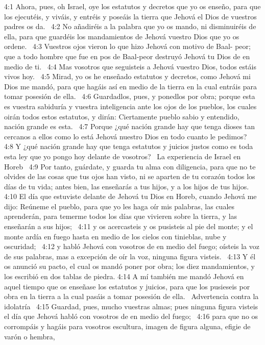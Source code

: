 4:1 Ahora, pues, oh Israel, oye los estatutos y decretos que yo os enseño, para que los ejecutéis, y viváis, y entréis y poseáis la tierra que Jehová el Dios de vuestros padres os da.  
4:2 No añadiréis a la palabra que yo os mando, ni disminuiréis de ella, para que guardéis los mandamientos de Jehová vuestro Dios que yo os ordene.  
4:3 Vuestros ojos vieron lo que hizo Jehová con motivo de Baal- peor; que a todo hombre que fue en pos de Baal-peor destruyó Jehová tu Dios de en medio de ti.  
4:4 Mas vosotros que seguisteis a Jehová vuestro Dios, todos estáis vivos hoy.  
4:5 Mirad, yo os he enseñado estatutos y decretos, como Jehová mi Dios me mandó, para que hagáis así en medio de la tierra en la cual entráis para tomar posesión de ella.  
4:6 Guardadlos, pues, y ponedlos por obra; porque esta es vuestra sabiduría y vuestra inteligencia ante los ojos de los pueblos, los cuales oirán todos estos estatutos, y dirán: Ciertamente pueblo sabio y entendido, nación grande es esta.  
4:7 Porque ¿qué nación grande hay que tenga dioses tan cercanos a ellos como lo está Jehová nuestro Dios en todo cuanto le pedimos?  
4:8 Y ¿qué nación grande hay que tenga estatutos y juicios justos como es toda esta ley que yo pongo hoy delante de vosotros?  
La experiencia de Israel en Horeb  
4:9 Por tanto, guárdate, y guarda tu alma con diligencia, para que no te olvides de las cosas que tus ojos han visto, ni se aparten de tu corazón todos los días de tu vida; antes bien, las enseñarás a tus hijos, y a los hijos de tus hijos.  
4:10 El día que estuviste delante de Jehová tu Dios en Horeb, cuando Jehová me dijo: Reúneme el pueblo, para que yo les haga oír mis palabras, las cuales aprenderán, para temerme todos los días que vivieren sobre la tierra, y las enseñarán a sus hijos;  
4:11 y os acercasteis y os pusisteis al pie del monte; y el monte ardía en fuego hasta en medio de los cielos con tinieblas, nube y oscuridad;  
4:12 y habló Jehová con vosotros de en medio del fuego; oísteis la voz de sus palabras, mas a excepción de oír la voz, ninguna figura visteis.  
4:13 Y él os anunció su pacto, el cual os mandó poner por obra; los diez mandamientos, y los escribió en dos tablas de piedra. 
4:14 A mí también me mandó Jehová en aquel tiempo que os enseñase los estatutos y juicios, para que los pusieseis por obra en la tierra a la cual pasáis a tomar posesión de ella.  
Advertencia contra la idolatría  
4:15 Guardad, pues, mucho vuestras almas; pues ninguna figura visteis el día que Jehová habló con vosotros de en medio del fuego;  
4:16 para que no os corrompáis y hagáis para vosotros escultura, imagen de figura alguna, efigie de varón o hembra,  
